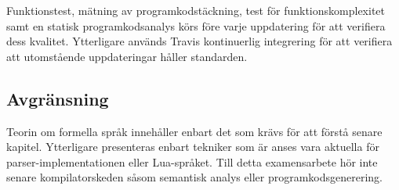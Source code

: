 Funktionstest, mätning av programkodstäckning, test för funktionskomplexitet
samt en statisk programkodsanalys körs före varje uppdatering för att
verifiera dess kvalitet. Ytterligare används Travis kontinuerlig integrering
för att verifiera att utomstående uppdateringar håller standarden.

\subsection{Avgränsning}

Teorin om formella språk innehåller enbart det som krävs för att förstå senare
kapitel. Ytterligare presenteras enbart tekniker som är anses vara aktuella
för parser-implementationen eller Lua-språket. Till detta examensarbete hör
inte senare kompilatorskeden såsom semantisk analys eller
programkodsgenerering.

